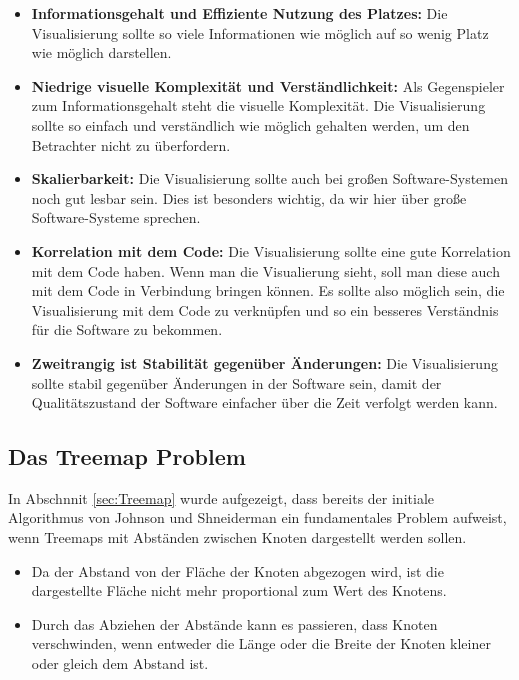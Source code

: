 \begin{itemize}
    \item \textbf{Informationsgehalt und Effiziente Nutzung des Platzes:} Die Visualisierung sollte so viele Informationen wie möglich auf so wenig Platz wie möglich darstellen.
    \item \textbf{Niedrige visuelle Komplexität und Verständlichkeit:} Als Gegenspieler zum Informationsgehalt steht die visuelle Komplexität. Die Visualisierung sollte so einfach und verständlich wie möglich gehalten werden, um den Betrachter nicht zu überfordern.
    \item \textbf{Skalierbarkeit:} Die Visualisierung sollte auch bei großen Software-Systemen noch gut lesbar sein. Dies ist besonders wichtig, da wir hier über große Software-Systeme sprechen.
    \item \textbf{Korrelation mit dem Code:} Die Visualisierung sollte eine gute Korrelation mit dem Code haben. Wenn man die Visualierung sieht, soll man diese auch mit dem Code in Verbindung bringen können. Es sollte also möglich sein, die Visualisierung mit dem Code zu verknüpfen und so ein besseres Verständnis für die Software zu bekommen.
    \item \textbf{Zweitrangig ist Stabilität gegenüber Änderungen:} Die Visualisierung sollte stabil gegenüber Änderungen in der Software sein, damit der Qualitätszustand der Software einfacher über die Zeit verfolgt werden kann.
\end{itemize}


\subsection{Das Treemap Problem} \label{sec:TreemapProblem}
In Abschnnit \ref{sec:Treemap} wurde aufgezeigt, dass bereits der initiale Algorithmus von Johnson und Shneiderman \cite{johnson1991tree} ein fundamentales Problem aufweist, wenn Treemaps mit Abständen zwischen Knoten dargestellt werden sollen. 
\begin{itemize}
    \item Da der Abstand von der Fläche der Knoten abgezogen wird, ist die dargestellte Fläche nicht mehr proportional zum Wert des Knotens.
    \item Durch das Abziehen der Abstände kann es passieren, dass Knoten verschwinden, wenn entweder die Länge oder die Breite der Knoten kleiner oder gleich dem Abstand ist.
\end{itemize}


